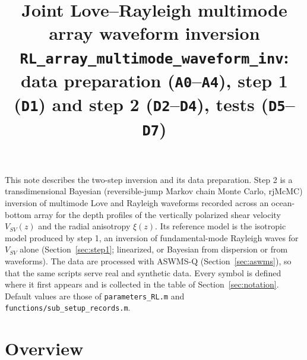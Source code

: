 \documentclass[11pt]{article}
\title{Joint Love--Rayleigh multimode array waveform inversion\\
\large\texttt{RL\_array\_multimode\_waveform\_inv}: data preparation (\texttt{A0}--\texttt{A4}),
step 1 (\texttt{D1}) and step 2 (\texttt{D2}--\texttt{D4}), tests (\texttt{D5}--\texttt{D7})}
\date{}
\newcommand{\vsv}{V_{SV}}
\begin{document}
\maketitle

\noindent This note describes the two-step inversion and its data
preparation. Step 2 is a transdimensional Bayesian (reversible-jump Markov
chain Monte Carlo, rjMcMC) inversion of multimode Love and Rayleigh
waveforms recorded across an ocean-bottom array for the depth profiles of
the vertically polarized shear velocity $\vsv(z)$ and the radial
anisotropy $\xi(z)$. Its reference model is the isotropic model produced by
step 1, an inversion of fundamental-mode Rayleigh waves for $\vsv$ alone
(Section~\ref{sec:step1}; linearized, or Bayesian from dispersion or from
waveforms). The data are processed with ASWMS-Q
(Section~\ref{sec:aswms}), so that the same scripts serve real and
synthetic data. Every symbol is defined where it first appears and is
collected in the table of Section~\ref{sec:notation}. Default values are
those of \texttt{parameters\_RL.m} and \texttt{functions/sub\_setup\_records.m}.

\tableofcontents

\section{Overview}
\end{document}
